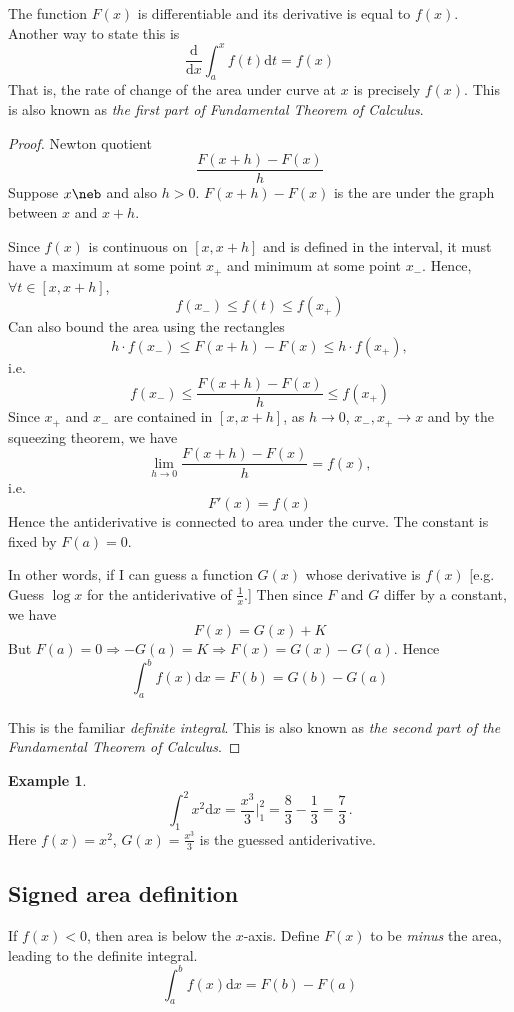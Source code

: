 \documentclass[12pt]{report}
\theoremstyle{definition}
\begin{document}
\begin{theorem}
    The function $F(x)$ is differentiable and its derivative is equal to $f(x)$.
    Another way to state this is \[
        \frac{\mathrm{d}}{\mathrm{d}x} \int_a^x {f(t)} \mathrm{d}t = f(x)
    \]That is, the rate of change of the area under curve at $x$ is precisely $f(x)$.
    This is also known as \emph{the first part of Fundamental Theorem of Calculus}.
\end{theorem}
\begin{proof}
    Newton quotient
    \[
        \frac{F(x+h)-F(x)}{h}
    \]
    Suppose $x\neb$ and also $h>0$.
    $F(x+h)-F(x)$ is the are under the graph between $x$ and $x+h$.

    Since $f(x)$ is continuous on $[x,x+h]$ and is defined in the interval, it must have a maximum at some point $x_+$
    and minimum at some point $x_-$. Hence, $\forall t\in[x,x+h]$, 
    \[
        f(x_-) \le f(t) \le f(x_+)
    \]
    Can also bound the area using the rectangles
    \[
        h\cdot f(x_-) \le F(x+h)-F(x) \le h\cdot f(x_+)
    ,\] i.e.
    \[
        f(x_-) \le \frac{F(x+h)-F(x)}{h} \le f(x_+)
    \]
    Since $x_+$ and $x_-$ are contained in $[x,x+h]$, as $h \to 0$, $x_-, x_+ \to x$ and by the squeezing theorem,
    we have \[
        \lim_{h \to 0} \frac{F(x+h)-F(x)}{h} = f(x)
    ,\] i.e. \[
      F'(x) = f(x)
    \]
    Hence the antiderivative is connected to area under the curve. The constant is fixed by $F(a) = 0$.

    In other words, if I can guess a function $G(x)$ whose derivative is $f(x)$ 
    [e.g. Guess $\log{x}$ for the antiderivative of $\frac{1}{x}$.]
    Then since $F$ and $G$ differ by a constant, we have \[
        F(x) = G(x) + K
    \]
    But $F(a)=0 \Rightarrow -G(a) = K \Rightarrow F(x) = G(x) - G(a)$.
    Hence \[
        \int_a^b f(x)\mathrm{d}x = F(b) = G(b) - G(a)
    \]
    \\This is the familiar \emph{definite integral}.
    This is also known as \emph{the second part of the Fundamental Theorem of Calculus}.
\end{proof}
\newtheorem{ex}[theorem]{Example}
\begin{ex}
    \[
        \int_1^2 x^2\mathrm{d}x = \frac{x^3}{3} \Big|_1^2 = \frac{8}{3} - \frac{1}{3} = \frac{7}{3}
    \,.\]
    Here $f(x) = x^2$, $G(x) = \frac{x^3}{3}$ is the guessed antiderivative.
\end{ex}
\subsection{Signed area definition}
If $f(x)<0$, then area is below the $x$-axis. Define $F(x)$ to be \emph{minus} the area, leading to the definite integral.
\[
    \int_a^b f(x)\mathrm{d}x = F(b) - F(a)
\]
\end{document}
